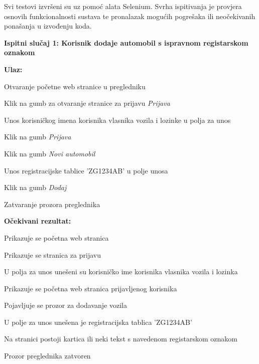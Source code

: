 			
			Svi testovi izvršeni su uz pomoć alata Selenium. Svrha ispitivanja je provjera osnovih funkcionalnosti sustava te pronalazak mogućih pogrešaka ili neočekivanih ponašanja u izvođenju koda.
			
			\hfill\break
			\noindent\textbf{Ispitni slučaj 1: Korisnik dodaje automobil s ispravnom registarskom oznakom}
			
			\hfill\break
			\noindent\textbf{Ulaz:}
			
			\begin{packed_enum}
			
			\item Otvaranje početne web stranice u pregledniku
			\item Klik na gumb za otvaranje stranice za prijavu \textit{Prijava}
			\item Unos korisničkog imena korisnika vlasnika vozila i lozinke u polja za unos
			\item Klik na gumb \textit{Prijava}
			\item Klik na gumb \textit{Novi automobil}
			\item Unos registracijske tablice 'ZG1234AB' u polje unosa
			\item Klik na gumb \textit{Dodaj}
			\item Zatvaranje prozora preglednika
				
			\end{packed_enum}
			
			\noindent\textbf{Očekivani rezultat:}
			
			\begin{packed_enum}
				
				\item Prikazuje se početna web stranica
				\item Prikazuje se stranica za prijavu
				\item U polja za unos unešeni su korisničko ime korisnika vlasnika vozila i lozinka
				\item Prikazuje se početna web stranica prijavljenog korisnika
				\item Pojavljuje se prozor za dodavanje vozila
				\item U polje za unos unešena je registracijska tablica 'ZG1234AB'
				\item Na stranici postoji kartica ili neki tekst s navedenom registarskom oznakom
				\item Prozor preglednika zatvoren
				
			\end{packed_enum}
		
